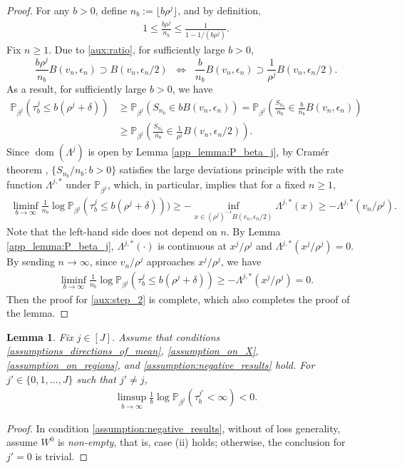 \documentclass[aap,preprint]{imsart}
\newcommand{\Pro}{{\mathbb{P}}}
\theoremstyle{plain}
\newtheorem{lemma}[theorem]{Lemma}
\theoremstyle{definition}
\begin{document}
\begin{appendix}
\begin{proof}
For any $b > 0$, define 
$n_b := \lfloor b   \rho^j \rfloor$, and by definition,
\begin{align}\label{aux:ratio}
 1 \leq \frac{b \rho^j}{n_b} \leq \frac{1}{1 - 1/(b\rho^j)}.
\end{align}
Fix $n \geq 1$. Due to \eqref{aux:ratio}, for sufficiently large $b > 0$,
$$
\frac{b \rho^j}{n_b} B(v_n, \epsilon_n) \supset B(v_n, \epsilon_n/2) \;\; \Leftrightarrow \;\; \frac{b }{n_b} B(v_n, \epsilon_n) \supset \frac{1}{\rho^j}B(v_n, \epsilon_n/2).
$$
As a result, for sufficiently large $b > 0$, we have
\begin{align*}
 \Pro_{\beta^j}\left(\tau_b^j \leq  b(\rho^j+\delta) \right) &\geq \Pro_{\beta^j}\left({S_{n_b}}\in  b B(v_n, \epsilon_n) \right)
 = \Pro_{\beta^j}\left(\frac{S_{n_b}}{n_b}\in \frac{b}{n_b} B(v_n, \epsilon_n) \right)\\
 &\geq \Pro_{\beta^j}\left(\frac{S_{n_b}}{n_b}\in \frac{1}{\rho^j} B(v_n, \epsilon_n/2) \right).
\end{align*}
Since $\operatorname{dom}(\Lambda^j)$ is open by Lemma \ref{app_lemma:P_beta_j}, by Cram\'er theorem \cite[Corollary 6.1.6]{dembo2009large}, $\{S_{n_b}/n_b: b > 0\}$ satisfies the large deviations principle with the rate function $\Lambda^{j,*}$ under $\Pro_{\beta^j}$, which, in particular, implies that for a fixed $n \geq 1$,
\begin{align*}
    \liminf_{b \to \infty} \frac{1}{n_b} \log \Pro_{\beta^j}(\tau_b^j \leq b (\rho^j + \delta))) \geq - \inf_{x \in (\rho^j)^{-1} B(v_n, \epsilon_n/2)} \Lambda^{j,*}(x) \geq - \Lambda^{j,*}(v_n/\rho^j).
\end{align*}
Note that the left-hand side does not depend on $n$. By  Lemma \ref{app_lemma:P_beta_j},  $\Lambda^{j,*}(\cdot)$ is continuous at $x^j/\rho^j$ and $\Lambda^{j,*}(x^j/\rho^j) = 0$. 
By sending $n \to \infty$, since $v_n/\rho^j$ approaches $x^j/\rho^j$,  we have
\begin{align*}
    \liminf_{b \to \infty} \frac{1}{n_b} \log \Pro_{\beta^j}(\tau_b^j \leq b (\rho^j + \delta)) \geq  - \Lambda^{j,*}(x^j/\rho^j) = 0.
\end{align*}
Then the proof for \eqref{aux:step_2} is complete, which also completes the proof of the lemma.
\end{proof}



\begin{lemma}\label{lemma:aux_prob2}
    Fix $j \in [J]$. 
    Assume that conditions \eqref{assumptions_directions_of_mean}, \eqref{assumption_on_X},  \eqref{assumption_on_regions}, and \eqref{assumption:negative_results} hold.  For $j' \in \{0,1,\ldots,J\}$ such that $j' \neq j$,
        \begin{align*}
          \limsup_{b \to \infty} \frac{1}{b}  \log \Pro_{\beta^j}\left(\tau_b^{j'} < \infty\right) < 0.
        \end{align*}  
\end{lemma}
\begin{proof}
In condition \eqref{assumption:negative_results}, without of loss generality, assume $W^{0}$ is \textit{non-empty}, that is, case (ii) holds; otherwise, the conclusion for $j' = 0$ is trivial.


\end{proof}
\end{appendix}
\end{document}
